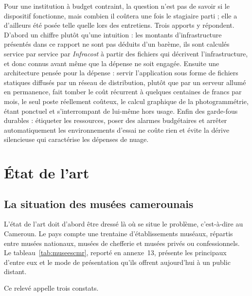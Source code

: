 Pour une institution à budget contraint, la question n'est pas de savoir si le
dispositif fonctionne, mais combien il coûtera une fois le stagiaire parti ; elle
a d'ailleurs été posée telle quelle lors des entretiens. Trois apports y
répondent. D'abord un chiffre plutôt qu'une intuition : les montants
d'infrastructure présentés dans ce rapport ne sont pas déduits d'un barème, ils
sont calculés service par service par \emph{Infracost} à partir des fichiers qui
décrivent l'infrastructure, et donc connus avant même que la dépense ne soit
engagée. Ensuite une architecture pensée pour la dépense : servir l'application
sous forme de fichiers statiques diffusés par un réseau de distribution, plutôt
que par un serveur allumé en permanence, fait tomber le coût récurrent à
quelques centaines de francs par mois, le seul poste réellement coûteux, le
calcul graphique de la photogrammétrie, étant ponctuel et s'interrompant de
lui-même hors usage. Enfin des garde-fous durables : étiqueter les ressources,
poser des alarmes budgétaires et arrêter automatiquement les environnements
d'essai ne coûte rien et évite la dérive silencieuse qui caractérise les
dépenses de nuage.

\section{État de l'art}
\label{sec:etatart}

\subsection{La situation des musées camerounais}

L'état de l'art doit d'abord être dressé là où se situe le problème, c'est-à-dire
au Cameroun. Le pays compte une trentaine d'établissements muséaux, répartis
entre musées nationaux, musées de chefferie et musées privés ou confessionnels.
Le tableau~\ref{tab:museescmr}, reporté en annexe~13, présente les principaux
d'entre eux et le mode de présentation qu'ils offrent aujourd'hui à un public
distant.


Ce relevé appelle trois constats.

